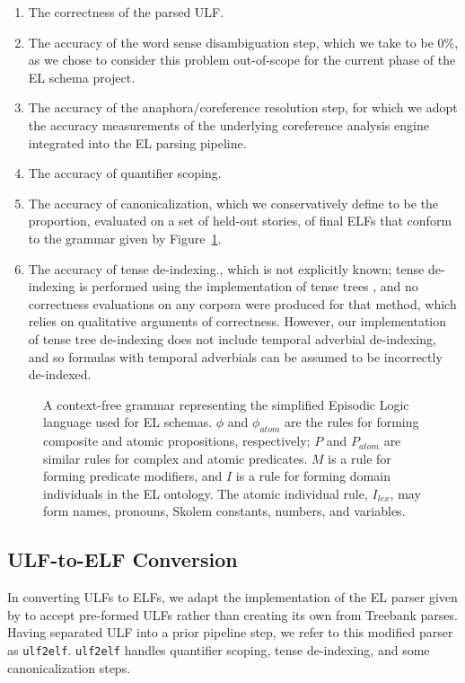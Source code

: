 \begin{enumerate}
    \item The correctness of the parsed ULF.
    \item The accuracy of the word sense disambiguation step, which we take to be $0\%$, as we chose to consider this problem out-of-scope for the current phase of the EL schema project.
    \item The accuracy of the anaphora/coreference resolution step, for which we adopt the accuracy measurements of the underlying coreference analysis engine integrated into the EL parsing pipeline.
    \item The accuracy of quantifier scoping.
    \item The accuracy of canonicalization, which we conservatively define to be the proportion, evaluated on a set of held-out stories, of final ELFs that conform to the grammar given by Figure~\ref{fig:el_cfg}.
    \item The accuracy of tense de-indexing., which is not explicitly known; tense de-indexing is performed using the implementation of tense trees \citet{schubert1990tensetrees}, and no correctness evaluations on any corpora were produced for that method, which relies on qualitative arguments of correctness. However, our implementation of tense tree de-indexing does not include temporal adverbial de-indexing, and so formulas with temporal adverbials can be assumed to be incorrectly de-indexed.
\end{enumerate}

\begin{figure}
    \centering
    
    \normalsize
    \caption{A context-free grammar representing the simplified Episodic Logic language used for EL schemas. $\phi$ and $\phi_{atom}$ are the rules for forming composite and atomic propositions, respectively; $P$ and $P_{atom}$ are similar rules for complex and atomic predicates. $M$ is a rule for forming predicate modifiers, and $I$ is a rule for forming domain individuals in the EL ontology. The atomic individual rule, $I_{lex}$, may form names, pronouns, Skolem constants, numbers, and variables.}
    \label{fig:el_cfg}
\end{figure}

\subsection{ULF-to-ELF Conversion}
In converting ULFs to ELFs, we adapt the implementation of the EL parser given by \citet{schubert-2014-treebank} to accept pre-formed ULFs rather than creating its own from Treebank parses. Having separated ULF into a prior pipeline step, we refer to this modified parser as \texttt{ulf2elf}. \texttt{ulf2elf} handles quantifier scoping, tense de-indexing, and some canonicalization steps.

